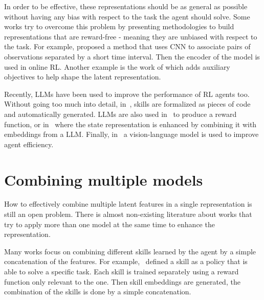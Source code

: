 In order to be effective, these representations should be as general as possible without having any bias with respect to the task the agent should solve.
Some works try to overcome this problem by presenting methodologies to build representations that are reward-free - meaning they are unbiased with respect to the task.
For example, \citet{stooke2021decoupling} proposed a method that uses CNN to associate pairs of observations separated by a short time interval.
Then the encoder of the model is used in online RL.
Another example is the work of \citet{lan2023bootstrapped} which adds auxiliary objectives to help shape the latent representation.

Recently, LLMs have been used to improve the performance of RL agents too.
Without going too much into detail, in~\citet{wang2023voyager}, skills are formalized as pieces of code and automatically generated.
LLMs are also used in~\citet{yu2023language} to produce a reward function, or in~\citet{lifshitz2024steve} where the state representation is enhanced by combining it with embeddings from a LLM\@.
Finally, in~\citet{brohan2023rt} a vision-language model is used to improve agent efficiency.




\section{Combining multiple models}\label{sec:fm_rl_combination}

How to effectively combine multiple latent features in a single representation is still an open problem.
There is almost non-existing literature about works that try to apply more than one model at the same time to enhance the representation.

Many works focus on combining different skills learned by the agent by a simple concatenation of the features.
For example,~\citet{sahni2017learning} defined a skill as a policy that is able to solve a specific task.
Each skill is trained separately using a reward function only relevant to the one.
Then skill embeddings are generated, the combination of the skills is done by a simple concatenation.






